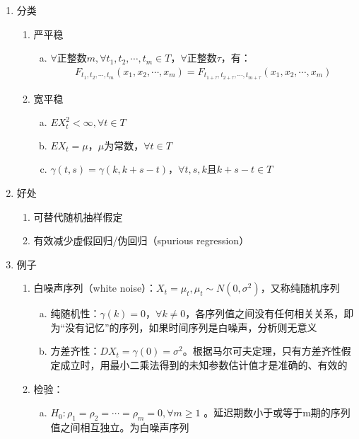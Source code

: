 \documentclass[12pt]{book}
\begin{document}
\begin{enumerate}[1.]
    \item 分类
    \begin{enumerate}[(1)]
        \item 严平稳
        \begin{enumerate}[a.]
            \item $\forall \text{正整数}m,\forall t_1,t_2,⋯,t_m\in T，\forall \text{正整数}\tau$，有：
            \begin{gather*}
                F_{t_1,t_2,⋯,t_m}(x_1,x_2,⋯,x_m)=F_{t_{1+\tau },t_{2+\tau },⋯,t_{m+\tau }}(x_1,x_2,⋯,x_m)
            \end{gather*}
        \end{enumerate}
        \item 宽平稳
        \begin{enumerate}[a.]
            \item $EX_t^2<\infty,\forall t\in T$  
            \item $EX_t=\mu$，$\mu$为常数，$\forall t\in T$  
            \item $\gamma (t,s)=\gamma (k,k+s-t)$，$\forall t,s,k$且$k+s-t\in T$
        \end{enumerate}
    \end{enumerate}
    \item 好处
    \begin{enumerate}
        \item 可替代随机抽样假定
        \item 有效减少虚假回归/伪回归（spurious regression）
    \end{enumerate}
    \item 例子
\begin{enumerate}[(1)]
    \item 白噪声序列（white noise）：$X_t=\mu_t, \mu_t\sim N(0,\sigma^2)$，又称纯随机序列
\begin{enumerate}[a.]
    \item 纯随机性：$\gamma(k)=0，\forall k\neq 0$，各序列值之间没有任何相关关系，即为“没有记忆”的序列，如果时间序列是白噪声，分析则无意义  
    \item 方差齐性：$DX_t=\gamma(0)=\sigma^2$。根据马尔可夫定理，只有方差齐性假定成立时，用最小二乘法得到的未知参数估计值才是准确的、有效的
\end{enumerate}
\item 检验：
    \begin{enumerate}[a.]
        \item $H_0:\rho _1=\rho _2=\cdots =\rho _m=0,\forall m\geqslant 1$ 。延迟期数小于或等于m期的序列值之间相互独立。为白噪声序列  

\end{enumerate}
\end{enumerate}
\end{enumerate}
\end{document}
